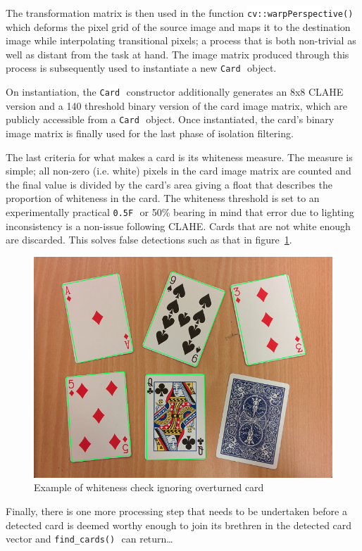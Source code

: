 \documentclass[a4paper,12pt,notitlepage]{article}
\newcommand{\code}[1]{\colorbox{white}{\lstinline[basicstyle=\ttfamily\color{black}]|#1|} }
\begin{document}
			The transformation matrix is then used in the function \code{cv::warpPerspective()} which deforms the pixel grid of the source image and maps it to the destination image while interpolating transitional pixels; a process that is both non-trivial as well as distant from the task at hand. The image matrix produced through this process is subsequently used to instantiate a new \code{Card} object.

			On instantiation, the \code{Card} constructor additionally generates an 8x8 CLAHE version and a 140 threshold binary version of the card image matrix, which are publicly accessible from a \code{Card} object. Once instantiated, the card's binary image matrix is finally used for the last phase of isolation filtering.

			The last criteria for what makes a card is its whiteness measure. The measure is simple; all non-zero (i.e. white) pixels in the card image matrix are counted and the final value is divided by the card's area giving a float that describes the proportion of whiteness in the card. The whiteness threshold is set to an experimentally practical \code{0.5F} or 50\% bearing in mind that error due to lighting inconsistency is a non-issue following CLAHE. Cards that are not white enough are discarded. This solves false detections such as that in figure~\ref{fig:whiteness}.

			\begin{figure}[H]
				\centering
				\includegraphics[width=0.9\linewidth]{whiteness}
				\caption{Example of whiteness check ignoring overturned card}
				\label{fig:whiteness}
			\end{figure}

			Finally, there is one more processing step that needs to be undertaken before a detected card is deemed worthy enough to join its brethren in the detected card vector and \code{find_cards()} can return\ldots
\end{document}

